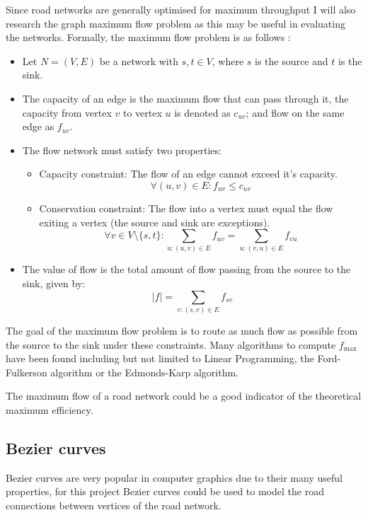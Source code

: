         Since road networks are generally optimised for maximum throughput I will also research the graph maximum flow problem as this may be useful in evaluating the networks. Formally, the maximum flow problem is as follows \cite{maximum-graph-flow}:

        \begin{itemize}
            \item Let $N = (V,E)$ be a network with $s, t \in V$, where $s$ is the source and $t$ is the sink.
            \item The capacity of an edge is the maximum flow that can pass through it, the capacity from vertex $v$ to vertex $u$ is denoted as $c_{uv}$; and flow on the same edge as $f_{uv}$.
            \item The flow network must satisfy two properties:
            \begin{itemize}
                \item Capacity constraint: The flow of an edge cannot exceed it's capacity. \[\forall (u, v) \in E : f_{uv} \leq c_{uv}\]
                \item Conservation constraint: The flow into a vertex must equal the flow exiting a vertex (the source and sink are exceptions).
                \[\forall v \in V \setminus \{s, t\} : \sum_{u : (u, v) \in E} f_{uv} = \sum_{u : (v, u) \in E} f_{vu}\]
            \end{itemize}
            \item The value of flow is the total amount of flow passing from the source to the sink, given by:
            \[|f| = \sum_{v : (s, v) \in E} f_{sv}\]
        \end{itemize}

        The goal of the maximum flow problem is to route as much flow as possible from the source to the sink under these constraints. Many algorithms to compute $f_\text{max}$ have been found including but not limited to Linear Programming, the Ford-Fulkerson algorithm or the Edmonds-Karp algorithm.

        The maximum flow of a road network could be a good indicator of the theoretical maximum efficiency.

    \subsection{Bezier curves}
    \label{bezier}

        Bezier curves are very popular in computer graphics due to their many useful properties, for this project Bezier curves could be used to model the road connections between vertices of the road network.

